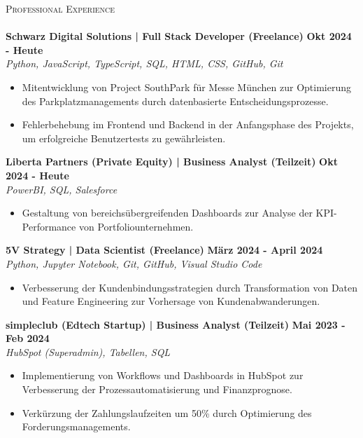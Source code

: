 \documentclass[a4paper]{article}
\newcommand{\lineunder} {
    \vspace*{-8pt} \\
    \hspace*{-18pt} \hrulefill \\
}
\newcommand{\header} [1] {
    {\hspace*{-18pt}\vspace*{6pt} \textsc{#1}}
    \vspace*{-6pt} \lineunder
}
\begin{document}
\header{Professional Experience}
\textbf{Schwarz Digital Solutions | Full Stack Developer (Freelance)} \hfill \textbf{ Okt 2024 - Heute}\\
\textit{Python, JavaScript, TypeScript, SQL, HTML, CSS, GitHub, Git}
\vspace{-2mm}
\begin{itemize} \itemsep -2pt
	\item Mitentwicklung von Project SouthPark f\"ur Messe M\"unchen zur Optimierung des Parkplatzmanagements durch datenbasierte Entscheidungsprozesse.
    \item Fehlerbehebung im Frontend und Backend in der Anfangsphase des Projekts, um erfolgreiche Benutzertests zu gew\"ahrleisten.
\end{itemize}
\vspace{-1mm}
\textbf{Liberta Partners (Private Equity) | Business Analyst (Teilzeit)} \hfill \textbf{ Okt 2024 - Heute}\\
\textit{PowerBI, SQL, Salesforce}
\vspace{-2mm}
\begin{itemize} \itemsep -2pt
	\item Gestaltung von bereichs\"ubergreifenden Dashboards zur Analyse der KPI-Performance von Portfoliounternehmen.
\end{itemize}
\vspace{-1mm}
\textbf{5V Strategy | Data Scientist (Freelance)} \hfill \textbf{ M\"arz 2024 - April 2024}\\
\textit{Python, Jupyter Notebook, Git, GitHub, Visual Studio Code}\\
\vspace{-2mm}
\begin{itemize} \itemsep -2pt
	\item Verbesserung der Kundenbindungsstrategien durch Transformation von Daten und Feature Engineering zur Vorhersage von Kundenabwanderungen.
\end{itemize}
\vspace{-1mm}
\textbf{simpleclub (Edtech Startup) | Business Analyst (Teilzeit)} \hfill \textbf{ Mai 2023 - Feb 2024}\\
\textit{HubSpot (Superadmin), Tabellen, SQL}\\
\vspace{-2mm}
\begin{itemize} \itemsep -2pt
	\item Implementierung von Workflows und Dashboards in HubSpot zur Verbesserung der Prozessautomatisierung und Finanzprognose.
	\item Verk\"urzung der Zahlungslaufzeiten um 50\% durch Optimierung des Forderungsmanagements.
\end{itemize}
\end{document}
